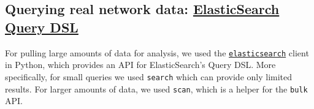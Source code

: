 \documentclass{finalreport}
\begin{document}
\subsection{Querying real network data: \href{https://www.elastic.co/guide/en/elasticsearch/reference/current/query-dsl.html}{ElasticSearch Query DSL}}\label{es}

For pulling large amounts of data for analysis, we used the \texttt{\href{https://elasticsearch-py.readthedocs.io/en/master/}{elasticsearch}} client in Python, which provides an API for ElasticSearch's Query DSL. More specifically, for small queries we used \texttt{search} which can provide only limited results. For larger amounts of data, we used \texttt{scan}, which is a helper for the \texttt{bulk} API.
\end{document}
